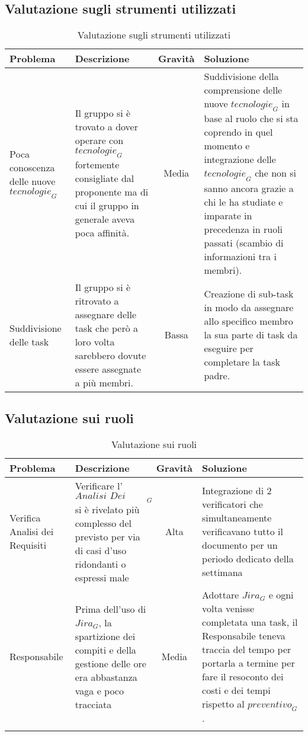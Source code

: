 \subsection{Valutazione sugli strumenti utilizzati}
\begin{table}[h]
\centering
\begin{tabular}{|p{3cm}|p{4cm}|c|p{5cm}|}
\hline
\rowcolor{gray!30}
\textbf{Problema} & \textbf{Descrizione} & \textbf{Gravità} & \textbf{Soluzione}\\
\hline
Poca conoscenza delle nuove $\textit{tecnologie}_G$ & 
Il gruppo si è trovato a dover operare con $\textit{tecnologie}_G$ fortemente consigliate dal proponente ma di cui il gruppo in generale aveva poca affinità. & 
Media & 
Suddivisione della comprensione delle nuove $\textit{tecnologie}_G$ in base al ruolo che si sta coprendo in quel momento e integrazione delle $\textit{tecnologie}_G$ che non si sanno ancora grazie a chi le ha studiate e imparate in precedenza in ruoli passati (scambio di informazioni tra i membri). \\
\hline
Suddivisione delle task &
Il gruppo si è ritrovato a assegnare delle task che però a loro volta sarebbero dovute essere assegnate a più membri. &
Bassa &
Creazione di sub-task in modo da assegnare allo specifico membro la sua parte di task da eseguire per completare la task padre.\\
\hline
\end{tabular}
\caption{Valutazione sugli strumenti utilizzati }
\end{table}



\subsection{Valutazione sui ruoli}
\begin{longtable}[h]{|p{3cm}|p{4cm}|c|p{5cm}|}
\hline
\rowcolor{gray!30}
\textbf{Problema} & \textbf{Descrizione} & \textbf{Gravità} & \textbf{Soluzione}\\
\hline
Verifica Analisi dei Requisiti &
Verificare l'$\textit{Analisi Dei Requisiti}_G$ si è rivelato più complesso del previsto per via di casi d'uso ridondanti o espressi male &
Alta &
Integrazione di 2 verificatori che simultaneamente verificavano tutto il documento per un periodo dedicato della settimana
\\
\hline
Responsabile & 
Prima dell'uso di $\textit{Jira}_G$, la spartizione dei compiti e della gestione delle ore era abbastanza vaga e poco tracciata &
Media &
Adottare $\textit{Jira}_G$ e ogni volta venisse completata una task, il Responsabile teneva traccia del tempo per portarla a termine per fare il resoconto dei costi e dei tempi rispetto al $\textit{preventivo}_G$.
\\
\hline
\caption{Valutazione sui ruoli}
\end{longtable}